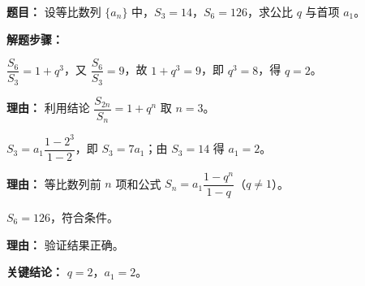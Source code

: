 \begin{examplebox}
	\textbf{\textcolor{CExample}{题目：}}
	设等比数列 $\{a_n\}$ 中，$S_3=14$，$S_6=126$，求公比 $q$ 与首项 $a_1$。

	\textbf{\textcolor{CExample}{解题步骤：}}
	\begin{description}[style=nextline, leftmargin=2.8em, labelsep=0.5em, itemsep=0.45em]
		\item[\textbf{第一步（片段比值）：}] $\dfrac{S_6}{S_3}=1+q^3$，又 $\dfrac{S_6}{S_3}=9$，故 $1+q^3=9$，即 $q^3=8$，得 $q=2$。
			\par\textbf{理由：} 利用结论 $\dfrac{S_{2n}}{S_n}=1+q^n$ 取 $n=3$。
		\item[\textbf{第二步（求和公式）：}] $S_3=a_1\dfrac{1-2^3}{1-2}$，即 $S_3=7a_1$；由 $S_3=14$ 得 $a_1=2$。
			\par\textbf{理由：} 等比数列前 $n$ 项和公式 $S_n=a_1\dfrac{1-q^n}{1-q}$（$q\neq1$）。
		\item[\textbf{第三步（结果检验）：}] $S_6=126$，符合条件。
			\par\textbf{理由：} 验证结果正确。
	\end{description}

	\textbf{\textcolor{CExample}{关键结论：}}
	$q=2$，$a_1=2$。
\end{examplebox}
